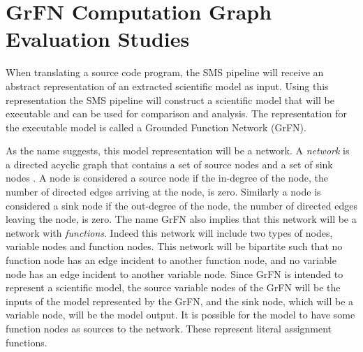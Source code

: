 \section{GrFN Computation Graph Evaluation Studies\label{sec:grfn_eval}}


When translating a source code program, the SMS pipeline will receive an abstract representation of an extracted scientific model as input.
Using this representation the SMS pipeline will construct a scientific model that will be executable and can be used for comparison and analysis.
The representation for the executable model is called a Grounded Function Network (GrFN).

As the name suggests, this model representation will be a network.
A \emph{network} is a directed acyclic graph that contains a set of source nodes and a set of sink nodes \citep{bondy1976graph}.
A node is considered a source node if the in-degree of the node, the number of directed edges arriving at the node, is zero.
Similarly a node is considered a sink node if the out-degree of the node, the number of directed edges leaving the node, is zero.
The name GrFN also implies that this network will be a network with \emph{functions}.
Indeed this network will include two types of nodes, variable nodes and function nodes.
This network will be bipartite such that no function node has an edge incident to another function node, and no variable node has an edge incident to another variable node.
Since GrFN is intended to represent a scientific model, the source variable nodes of the GrFN will be the inputs of the model represented by the GrFN, and the sink node, which will be a variable node, will be the model output.
It is possible for the model to have some function nodes as sources to the network.
These represent literal assignment functions.

